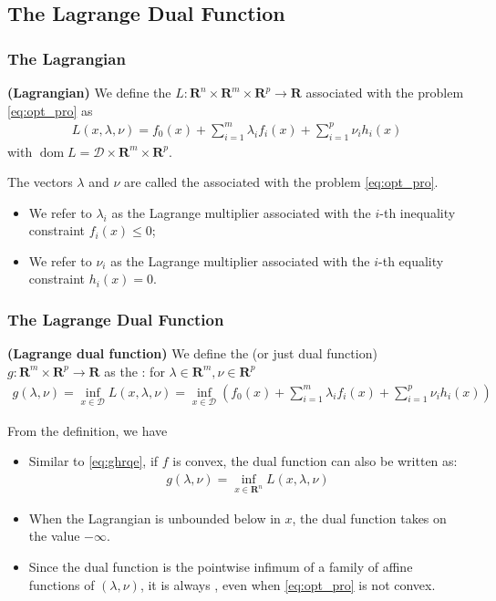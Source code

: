 \documentclass{article}
\newcommand{\bfs}[1]{\textbf{({#1}) }}
\newcommand{\dom}{\operatorname{dom}}
\begin{document}
\subsection{The Lagrange Dual Function}
\subsubsection{The Lagrangian}
\begin{defa}\bfs{Lagrangian}
We define the  $L: \mathbf{R}^{n} \times \mathbf{R}^{m} \times \mathbf{R}^{p} \rightarrow \mathbf{R}$ associated with the problem \cref{eq:opt_pro} as
\begin{align*}
L(x, \lambda, \nu)=f_{0}(x)+\sum_{i=1}^{m} \lambda_{i} f_{i}(x)+\sum_{i=1}^{p} \nu_{i} h_{i}(x)
\end{align*}
with  $\dom L=\mathcal{D} \times \mathbf{R}^{m} \times \mathbf{R}^{p} .$ 

The vectors $\lambda$ and $\nu$ are called the  associated with the problem \cref{eq:opt_pro}.
\begin{itemize}
    \item We refer to $\lambda_{i}$ as the Lagrange multiplier associated with the $i$-th inequality constraint $f_{i}(x) \leq 0$;
    \item We refer to $\nu_{i}$ as the Lagrange multiplier associated with the $i$-th equality constraint $h_{i}(x)=0$.
\end{itemize}   
\end{defa}
\subsubsection{The Lagrange Dual Function}
\begin{defa}\bfs{Lagrange dual function}
We define the  (or just dual function) $g: \mathbf{R}^{m} \times \mathbf{R}^{p} \rightarrow \mathbf{R}$ as the : for $\lambda \in \mathbf{R}^{m}, \nu \in \mathbf{R}^{p}$
\begin{align*}
g(\lambda, \nu)=\inf _{x \in \mathcal{D}} L(x, \lambda, \nu)=\inf _{x \in \mathcal{D}}\left(f_{0}(x)+\sum_{i=1}^{m} \lambda_{i} f_{i}(x)+\sum_{i=1}^{p} \nu_{i} h_{i}(x)\right)
\end{align*}
\end{defa}
\begin{rema}From the definition, we have
\begin{itemize}
    \item Similar to \cref{eq:ghrqe}, if $f$ is convex, the dual function can also be written as:
    \begin{align*}
g(\lambda, \nu)=\inf _{x \in \mathbf{R}^n} L(x, \lambda, \nu)
\end{align*}
    \item When the Lagrangian is unbounded below in $x$, the dual function takes on the value $-\infty$.
    \item Since the dual function is the pointwise infimum of a family of affine functions of $(\lambda, \nu)$, it is always , even when \cref{eq:opt_pro} is not convex.
\end{itemize}
\end{rema}
\end{document}
